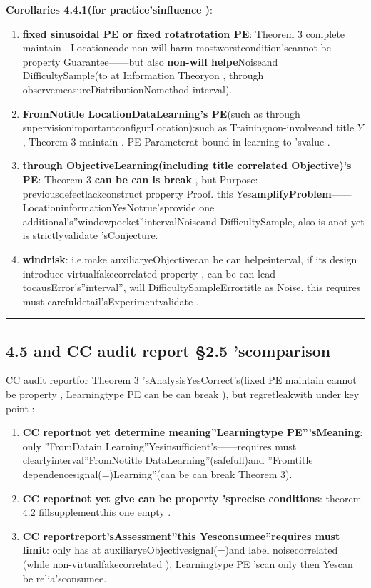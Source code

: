 \documentclass[
  12pt,
]{article}
\begin{document}
\textbf{Corollaries 4.4.1(for practice'sinfluence )}: 

\begin{enumerate}
\def\labelenumi{\arabic{enumi}.}
\item
  \textbf{fixed  sinusoidal PE or fixed rotatrotation PE}: Theorem 3
  complete maintain . Locationcode non-will harm mostworstcondition'scannot be property Guarantee------but also \textbf{non-will helpe}Noiseand DifficultySample(to at Information Theoryon , through observemeasureDistributionNomethod interval). 
\item
  \textbf{FromNotitle LocationDataLearning's
  PE}(such as through supervisionimportantconfigurLocation):such as Trainingnon-involveand title  \(Y\), Theorem 3
  maintain . PE Parameterat bound in learning to 'svalue . 
\item
  \textbf{through ObjectiveLearning(including title correlated Objective)'s PE}: Theorem 3
  \textbf{can be can is break }, but Purpose: previousdefectlackconstruct property Proof. this Yes\textbf{amplifyProblem}------LocationinformationYesNotrue'sprovide one additional's''windowpocket''intervalNoiseand DifficultySample, also is anot yet is strictlyvalidate 'sConjecture. 
\item
  \textbf{windrisk}: i.e.make auxiliaryeObjectivecan be can helpeinterval, if its design introduce virtualfakecorrelated property , can be can lead tocausError's''interval'', will DifficultySampleErrortitle as Noise. this requires must carefuldetail'sExperimentvalidate . 
\end{enumerate}

\begin{center}\rule{0.5\linewidth}{0.5pt}\end{center}

\subsection{4.5 and  CC audit report §2.5
'scomparison}\label{ux4e0e-cc-ux5ba1ux8ba1ux62a5ux544a-2.5-ux7684ux6bd4ux8f83}

CC audit reportfor  Theorem 3 'sAnalysisYesCorrect's(fixed  PE maintain cannot be property , Learningtype 
PE can be can break ), but regretleakwith under key point : 

\begin{enumerate}
\def\labelenumi{\arabic{enumi}.}
\item
  \textbf{CC reportnot yet determine meaning''Learningtype 
  PE'''sMeaning}: only ''FromDatain Learning''Yesinsufficient's------requires must clearlyinterval''FromNotitle DataLearning''(safefull)and ''Fromtitle dependencesignal(=)Learning''(can be can break 
  Theorem 3). 
\item
  \textbf{CC reportnot yet give can be property 'sprecise conditions}: theorem  4.2 fillsupplementthis one empty . 
\item
  \textbf{CC
  reportreport'sAssessment''this Yesconsumee''requires must limit}: only has at auxiliaryeObjectivesignal(=)and label noisecorrelated (while non-virtualfakecorrelated ), Learningtype 
  PE 'scan only then Yescan be relia'sconsumee. 
\end{enumerate}
\end{document}
